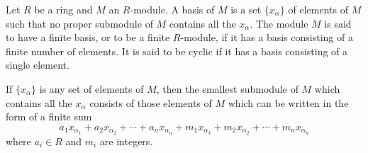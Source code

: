 Let $R$ be a ring and $M$ an $R$-module. A basis of $M$ is a set $\{x_\alpha\}$ of elements of $M$ such that no proper submodule of $M$ contains all the $x_\alpha$. The module $M$ is said to have a finite basis, or to be a finite $R$-module, if it has a basis consisting of a finite number of elements. It is said to be cyclic if it has a basis consisting of a single element.

If $\{x_\alpha\}$ is any set of elements of $M$, then the smallest submodule of $M$ which contains all the $x_\alpha$ consists of those elements of $M$ which can be written in the form of a finite sum
$$a_1 x_{\alpha_1} + a_2 x_{\alpha_2} + \cdots + a_n x_{\alpha_n} + m_1 x_{\alpha_1} + m_2 x_{\alpha_2} + \cdots + m_n x_{\alpha_n}$$
where $a_i \in R$ and $m_i$ are integers.
